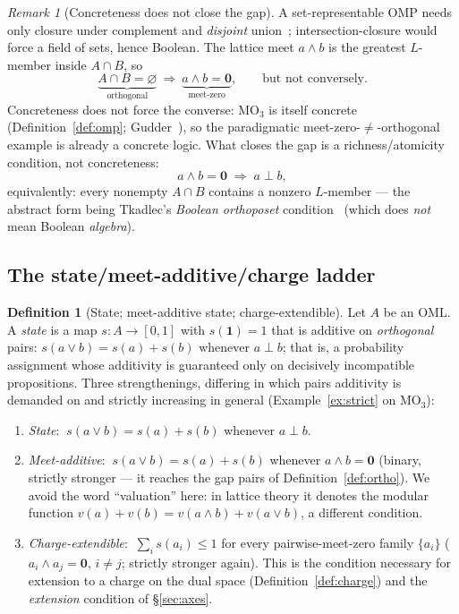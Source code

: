 \documentclass[11pt,reqno]{amsart}
\theoremstyle{plain}
\theoremstyle{definition}
\newtheorem{definition}[theorem]{Definition}
\theoremstyle{remark}
\newtheorem{remark}[theorem]{Remark}
\begin{document}
\begin{remark}[Concreteness does not close the gap]\label{rem:concrete}
A set-representable OMP needs only closure under complement and \emph{disjoint}
union~\cite{BuresovaPtak2024}; intersection-closure would force a field of
sets, hence Boolean. The lattice meet $a\wedge b$ is the greatest $L$-member
inside $A\cap B$, so
\[
  \underbrace{A\cap B=\varnothing}_{\text{orthogonal}}
  \ \Longrightarrow\
  \underbrace{a\wedge b=\mathbf 0}_{\text{meet-zero}},
  \qquad\text{but not conversely.}
\]
Concreteness does not force the converse: $\mathrm{MO}_3$ is itself concrete
(Definition~\ref{def:omp}; Gudder~\cite{Gudder1979}), so the paradigmatic
meet-zero-$\neq$-orthogonal example is already a concrete logic. What closes the gap is a
richness/atomicity condition, not concreteness:
\[
  a\wedge b=\mathbf 0 \;\Rightarrow\; a\perp b,
\]
equivalently: every nonempty $A\cap B$ contains a nonzero $L$-member ---
the abstract form being Tkadlec's \emph{Boolean orthoposet}
condition~\cite{Tkadlec1994} (which does \emph{not} mean Boolean
\emph{algebra}).
\end{remark}

\subsection{The state/meet-additive/charge ladder}
\label{sec:ladder}

\begin{definition}[State; meet-additive state; charge-extendible]\label{def:ladder}
Let $A$ be an OML. A \emph{state} is a map $s : A \to [0,1]$ with
$s(\mathbf 1)=1$ that is additive on \emph{orthogonal} pairs:
$s(a \vee b) = s(a) + s(b)$ whenever $a \perp b$; that is, a probability
assignment whose additivity is guaranteed only on decisively incompatible
propositions. Three strengthenings, differing in which pairs additivity is
demanded on and strictly increasing in general (Example~\ref{ex:strict} on
$\mathrm{MO}_3$):
\begin{enumerate}[label=(\arabic*), noitemsep]
  \item \emph{State}: $\ s(a\vee b)=s(a)+s(b)$ whenever $a\perp b$.
  \item \emph{Meet-additive}: $\ s(a\vee b)=s(a)+s(b)$ whenever
    $a\wedge b=\mathbf 0$ (binary, strictly stronger --- it reaches the gap
    pairs of Definition~\ref{def:ortho}). We avoid the word ``valuation''
    here: in lattice theory it denotes the modular function
    $v(a)+v(b)=v(a\wedge b)+v(a\vee b)$, a different condition.
  \item \emph{Charge-extendible}: $\ \sum_i s(a_i)\leq 1$ for every
    pairwise-meet-zero family $\{a_i\}$ ($a_i\wedge a_j=\mathbf 0$, $i\neq j$;
    strictly stronger again). This is the condition necessary for extension to
    a charge on the dual space (Definition~\ref{def:charge}) and the
    \emph{extension} condition of \S\ref{sec:axes}.
\end{enumerate}
\end{definition}
\end{document}
